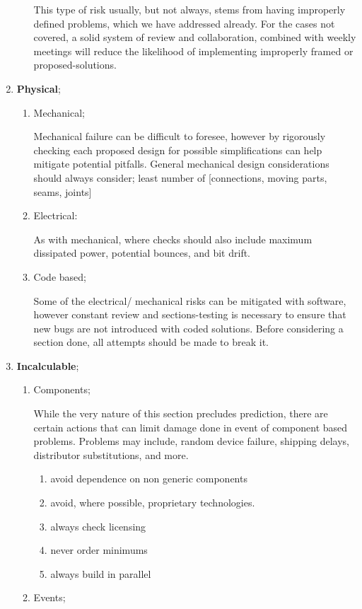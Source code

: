 \begin{enumerate}
\begin{enumerate}
  This type of risk usually, but not always, stems from having improperly defined problems, which we have  addressed already. For the cases not covered, a solid system of review and collaboration, combined with weekly meetings will reduce the likelihood of implementing improperly framed or proposed-solutions.
  
  \end{enumerate} 
  \item \textbf{Physical};
  \begin{enumerate}
  \item Mechanical; 
  
  Mechanical failure can be difficult to foresee, however by rigorously checking each proposed design for possible simplifications can help mitigate potential pitfalls. General mechanical design considerations should always consider; least number of [connections, moving parts, seams, joints]
  \item Electrical:
  
  As with mechanical, where checks should also include maximum dissipated power, potential bounces, and bit drift.
  \item Code based;
  
  Some of the electrical/ mechanical risks can be mitigated with software, however constant review and sections-testing is necessary to ensure that new bugs are not introduced with coded solutions.  Before considering a section done, all attempts should be made to break it.
  

  \end{enumerate}
  \item \textbf{Incalculable}; 
  \begin{enumerate}
  \item Components;
  
  While the very nature of this section precludes prediction, there are certain actions that can limit damage done in event of component based problems. Problems may include, random device failure, shipping delays, distributor substitutions, and more.
  \begin{enumerate}
  \item avoid dependence on non generic components
  \item avoid, where possible, proprietary technologies.
  \item always check licensing 
  \item never order minimums 
  \item always build in parallel
  \end{enumerate}
  \item Events;
  

\end{enumerate}
\end{enumerate}
